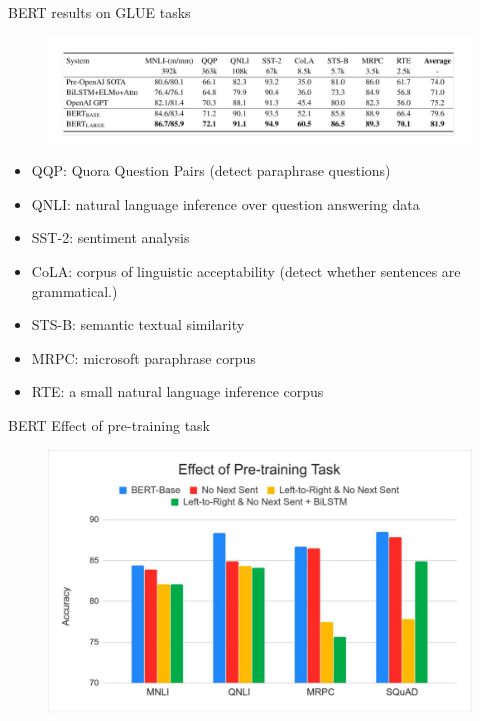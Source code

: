 \documentclass[handout]{beamer}
\begin{document}
\begin{frame}{BERT results on GLUE tasks}
\begin{scriptsize}

 \begin{figure}[h]
        	\includegraphics[scale = 0.26]{pics/BERTGLUE.png}
        \end{figure}  


\begin{itemize}

\item QQP: Quora Question Pairs (detect paraphrase questions)
\item QNLI: natural language inference over question answering data
\item SST-2: sentiment analysis 
\item CoLA: corpus of linguistic acceptability (detect whether sentences are grammatical.)
\item STS-B: semantic textual similarity
\item MRPC: microsoft paraphrase corpus
\item  RTE: a small natural language inference corpus
\end{itemize}

\end{scriptsize}




\end{frame}

\begin{frame}{BERT Effect of pre-training task}


 \begin{figure}[h]
        	\includegraphics[scale = 0.2]{pics/BERTeffect.png}
        \end{figure}  


\end{frame}
\end{document}
